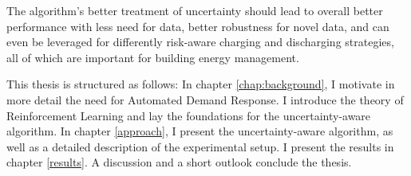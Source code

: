The algorithm's better treatment of uncertainty should lead to overall better performance with less need for data, better robustness for novel data, and can even be leveraged for differently risk-aware charging and discharging strategies, all of which are important for building energy management.

This thesis is structured as follows: In chapter \ref{chap:background}, I motivate in more detail the need for Automated Demand Response. I introduce the theory of Reinforcement Learning and lay the foundations for the uncertainty-aware algorithm.
In chapter \ref{approach}, I present the uncertainty-aware algorithm, as well as a detailed description of the experimental setup.
I present the results in chapter \ref{results}.
A discussion and a short outlook conclude the thesis.
